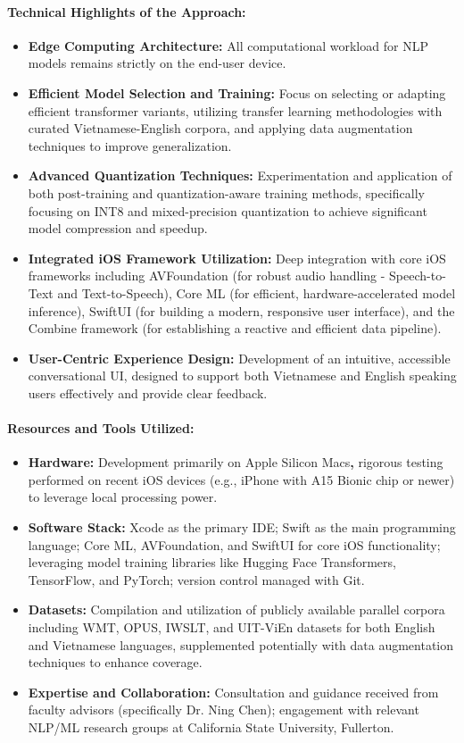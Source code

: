 \documentclass[12pt]{article}
\begin{document}
\paragraph{Technical Highlights of the Approach:}

\begin{itemize}
    \item \textbf{Edge Computing Architecture:} All computational workload for NLP models remains strictly on the end-user device.
    \item \textbf{Efficient Model Selection and Training:} Focus on selecting or adapting efficient transformer variants, utilizing transfer learning methodologies with curated Vietnamese-English corpora, and applying data augmentation techniques to improve generalization.
    \item \textbf{Advanced Quantization Techniques:} Experimentation and application of both post-training and quantization-aware training methods, specifically focusing on INT8 and mixed-precision quantization to achieve significant model compression and speedup.
    \item \textbf{Integrated iOS Framework Utilization:} Deep integration with core iOS frameworks including AVFoundation (for robust audio handling - Speech-to-Text and Text-to-Speech), Core ML (for efficient, hardware-accelerated model inference), SwiftUI (for building a modern, responsive user interface), and the Combine framework (for establishing a reactive and efficient data pipeline).
    \item \textbf{User-Centric Experience Design:} Development of an intuitive, accessible conversational UI, designed to support both Vietnamese and English speaking users effectively and provide clear feedback.
\end{itemize}

\paragraph{Resources and Tools Utilized:}
\begin{itemize}
    \item \textbf{Hardware:} Development primarily on Apple Silicon Macs\textbf{,} rigorous testing performed on recent iOS devices (e.g., iPhone with A15 Bionic chip or newer) to leverage local processing power.
    \item \textbf{Software Stack:} Xcode as the primary IDE; Swift as the main programming language; Core ML, AVFoundation, and SwiftUI for core iOS functionality; leveraging model training libraries like Hugging Face Transformers, TensorFlow, and PyTorch; version control managed with Git.
    \item \textbf{Datasets:} Compilation and utilization of publicly available parallel corpora including WMT, OPUS, IWSLT, and UIT-ViEn datasets for both English and Vietnamese languages, supplemented potentially with data augmentation techniques to enhance coverage.
    \item \textbf{Expertise and Collaboration:} Consultation and guidance received from faculty advisors (specifically Dr. Ning Chen); engagement with relevant NLP/ML research groups at California State University, Fullerton.
\end{itemize}
\end{document}
